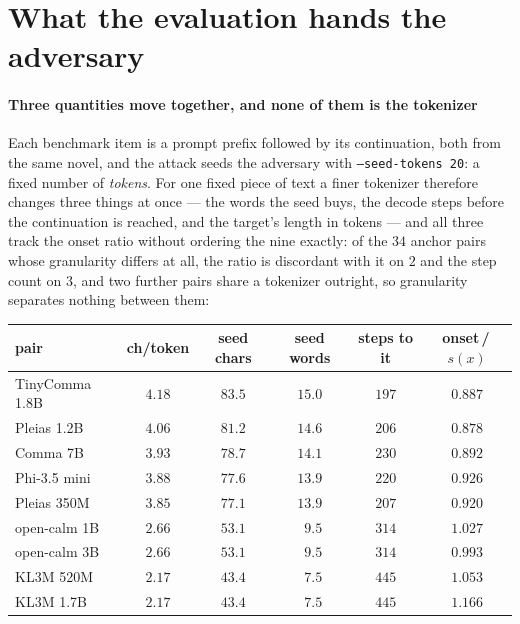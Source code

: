 \section{What the evaluation hands the adversary}\label{app:seed}

\paragraph{Three quantities move together, and none of them is the tokenizer}
Each benchmark item is a prompt prefix followed by its continuation, both from the same novel, and
the attack seeds the adversary with \texttt{--seed-tokens 20}: a fixed number of \emph{tokens}. For one
fixed piece of text a finer tokenizer therefore changes three things at once --- the words the seed
buys, the decode steps before the continuation is reached, and the target's length in tokens --- and
all three track the onset ratio without ordering the nine exactly: of the $34$ anchor pairs whose
granularity differs at all, the ratio is discordant with it on $2$ and the step count on $3$, and
two further pairs share a tokenizer outright, so granularity separates nothing between them:

\begin{center}\footnotesize
\setlength{\tabcolsep}{4pt}
\begin{tabular}{@{}lccccc@{}}
\toprule
pair & ch/token & seed chars & seed words & steps to it & onset\,/\,$s(x)$ \\
\midrule
TinyComma 1.8B  & $4.18$ & $83.5$ & $15.0$ & $197$ & $0.887$ \\
Pleias 1.2B     & $4.06$ & $81.2$ & $14.6$ & $206$ & $0.878$ \\
Comma 7B        & $3.93$ & $78.7$ & $14.1$ & $230$ & $0.892$ \\
Phi-3.5 mini    & $3.88$ & $77.6$ & $13.9$ & $220$ & $0.926$ \\
Pleias 350M     & $3.85$ & $77.1$ & $13.9$ & $207$ & $0.920$ \\
open-calm 1B    & $2.66$ & $53.1$ & $\phantom{0}9.5$ & $314$ & $1.027$ \\
open-calm 3B    & $2.66$ & $53.1$ & $\phantom{0}9.5$ & $314$ & $0.993$ \\
KL3M 520M       & $2.17$ & $43.4$ & $\phantom{0}7.5$ & $445$ & $1.053$ \\
KL3M 1.7B       & $2.17$ & $43.4$ & $\phantom{0}7.5$ & $445$ & $1.166$ \\
\bottomrule
\end{tabular}
\end{center}

